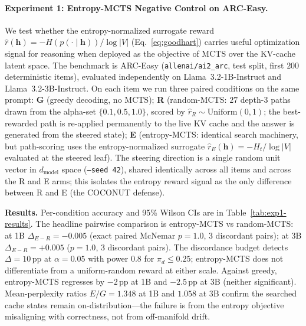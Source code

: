 \paragraph{Experiment 1: Entropy-MCTS Negative Control on ARC-Easy.}\label{sec:exp1}
We test whether the entropy-normalized surrogate reward $\hat{r}(\mathbf{h}) = -H(p(\cdot \mid \mathbf{h}))/\log|V|$ (Eq.~\ref{eq:goodhart}) carries useful optimization signal for reasoning when deployed as the objective of MCTS over the KV-cache latent space. The benchmark is ARC-Easy (\texttt{allenai/ai2\_arc}, test split, first $200$ deterministic items), evaluated independently on Llama~3.2-1B-Instruct and Llama~3.2-3B-Instruct. On each item we run three paired conditions on the same prompt: \textbf{G} (greedy decoding, no MCTS); \textbf{R} (random-MCTS: $27$ depth-$3$ paths drawn from the alpha-set $\{0.1, 0.5, 1.0\}$, scored by $\hat{r}_R \sim \mathrm{Uniform}(0, 1)$; the best-rewarded path is re-applied permanently to the live KV cache and the answer is generated from the steered state); \textbf{E} (entropy-MCTS: identical search machinery, but path-scoring uses the entropy-normalized surrogate $\hat{r}_E(\mathbf{h}) = -H_t/\log|V|$ evaluated at the steered leaf). The steering direction is a single random unit vector in $d_{\text{model}}$ space (\texttt{--seed 42}), shared identically across all items and across the R and E arms; this isolates the entropy reward signal as the only difference between R and E (the COCONUT defense).

\textbf{Results.} Per-condition accuracy and 95\% Wilson CIs are in Table~\ref{tab:exp1-results}. The headline pairwise comparison is entropy-MCTS vs random-MCTS: at 1B $\Delta_{E-R} = -0.005$ (exact paired McNemar $p = 1.0$, 3 discordant pairs); at 3B $\Delta_{E-R} = +0.005$ ($p = 1.0$, 3 discordant pairs). The discordance budget detects $\Delta = 10$\,pp at $\alpha = 0.05$ with power $0.8$ for $\pi_d \le 0.25$; entropy-MCTS does not differentiate from a uniform-random reward at either scale. Against greedy, entropy-MCTS regresses by $-2$\,pp at 1B and $-2.5$\,pp at 3B (neither significant). Mean-perplexity ratios $E/G = 1.348$ at 1B and $1.058$ at 3B confirm the searched cache states remain on-distribution---the failure is from the entropy objective misaligning with correctness, not from off-manifold drift.

